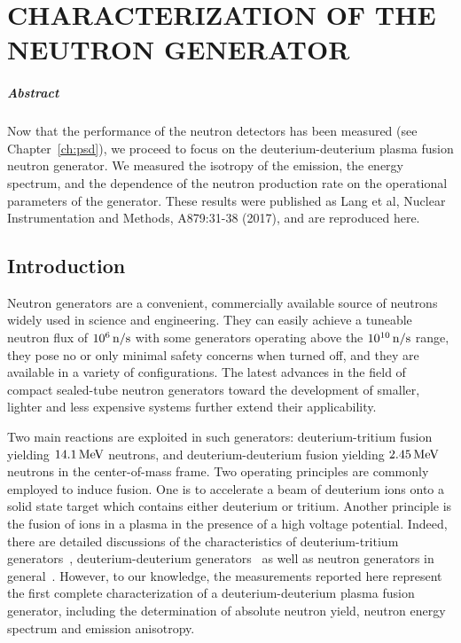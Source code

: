
\chapter{CHARACTERIZATION OF THE NEUTRON GENERATOR}\label{ch:ng}

\paragraph{Abstract} Now that the performance of the neutron detectors has been measured (see Chapter~\ref{ch:psd}), we proceed to focus on the deuterium-deuterium plasma fusion neutron generator. We measured the isotropy of the emission, the energy spectrum, and the dependence of the neutron production rate on the operational parameters of the generator. These results were published as Lang et al, Nuclear Instrumentation and Methods, A879:31-38 (2017), and are reproduced here.

\section{Introduction}

Neutron generators are a convenient, commercially available source of neutrons widely used in science and engineering. They can easily achieve a tuneable neutron flux of $10^6\,\mathrm{n/s}$ with some generators operating above the $10^{10}\,\mathrm{n/s}$ range, they pose no or only minimal safety concerns when turned off, and they are available in a variety of configurations. The latest advances in the field of compact sealed-tube neutron generators toward the development of smaller, lighter and less expensive systems further extend their applicability.

Two main reactions are exploited in such generators: deuterium-tritium fusion yielding $14.1\,\mathrm{MeV}$ neutrons, and deuterium-deuterium fusion yielding $2.45\,\mathrm{MeV}$ neutrons in the center-of-mass frame. Two operating principles are commonly employed to induce fusion. One is to accelerate a beam of deuterium ions onto a solid state target which contains either deuterium or tritium. Another principle is the fusion of ions in a plasma in the presence of a high voltage potential. Indeed, there are detailed discussions of the characteristics of deuterium-tritium generators~\cite{Guillame:1971}, deuterium-deuterium generators~\cite{Miley:1997,Miley:1999,Miley:2000} as well as neutron generators in general~\cite{CRC,Chernikova:2014}. However, to our knowledge, the measurements reported here represent the first complete characterization of a deuterium-deuterium plasma fusion generator, including the determination of absolute neutron yield, neutron energy spectrum and emission anisotropy.

